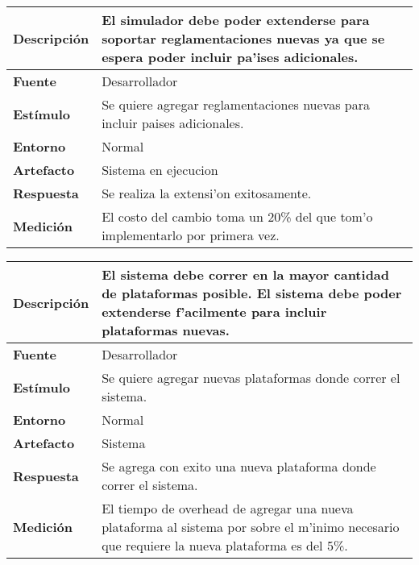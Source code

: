 \begin{center}
  \begin{tabular}{| l | p{10cm} | }
    \hline
  \textbf{Descripción} & El simulador debe poder extenderse para soportar reglamentaciones nuevas ya que se espera poder incluir pa'ises adicionales.\\  \hline
  \textbf{Fuente} & Desarrollador\\  \hline
  \textbf{Estímulo} & Se quiere agregar reglamentaciones nuevas para incluir paises adicionales.\\  \hline
  \textbf{Entorno} & Normal\\  \hline
  \textbf{Artefacto} & Sistema en ejecucion\\  \hline
  \textbf{Respuesta} & Se realiza la extensi'on exitosamente.\\  \hline
  \textbf{Medición} & El costo del cambio toma un 20\% del que tom'o implementarlo por primera vez.\\  \hline
  \end{tabular}
\end{center} 

\begin{center}
  \begin{tabular}{| l | p{10cm} | }
    \hline
  \textbf{Descripción} & El sistema debe correr en la mayor cantidad de plataformas posible. El sistema debe poder extenderse f'acilmente para incluir plataformas nuevas.\\  \hline
  \textbf{Fuente} & Desarrollador\\  \hline
  \textbf{Estímulo} & Se quiere agregar nuevas plataformas donde correr el sistema.\\  \hline
  \textbf{Entorno} & Normal\\  \hline
  \textbf{Artefacto} & Sistema\\  \hline
  \textbf{Respuesta} & Se agrega con exito una nueva plataforma donde correr el sistema.\\  \hline
  \textbf{Medición} & El tiempo de overhead de agregar una nueva plataforma al sistema por sobre el m'inimo necesario que requiere la nueva plataforma es del 5\%.\\  \hline
  \end{tabular}
\end{center} 

